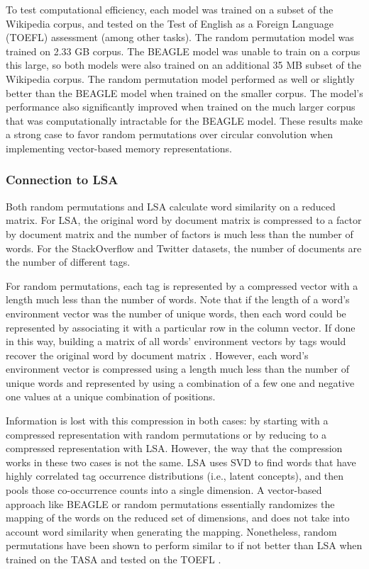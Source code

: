 \documentclass[man,floatsintext,donotrepeattitle]{apa6}
\begin{document}
To test computational efficiency, each model was trained on a subset of the Wikipedia corpus, and tested on the Test of English as a Foreign Language (TOEFL) assessment (among other tasks).
The random permutation model was trained on \num{2.33} GB corpus.
The BEAGLE model was unable to train on a corpus this large, so both models were also trained on an additional \num{35} MB subset of the Wikipedia corpus.
The random permutation model performed as well or slightly better than the BEAGLE model when trained on the smaller corpus.
The model's performance also significantly improved when trained on the much larger corpus that was computationally intractable for the BEAGLE model.
These results make a strong case to favor random permutations over circular convolution when implementing vector-based memory representations.

\subsubsection{Connection to LSA}

Both random permutations and LSA calculate word similarity on a reduced matrix.
For LSA, the original word by document matrix is compressed to a factor by document matrix and the number of factors is much less than the number of words.
For the StackOverflow and Twitter datasets, the number of documents are the number of different tags.

For random permutations, each tag is represented by a compressed vector with a length much less than the number of words.
Note that if the length of a word's environment vector was the number of unique words, then each word could be represented by associating it with a particular row in the column vector.
If done in this way, building a matrix of all words' environment vectors by tags would recover the original word by document matrix \parencite{Kanerva2000}.
However, each word's environment vector is compressed using a length much less than the number of unique words and represented by using a combination of a few one and negative one values at a unique combination of positions. 

Information is lost with this compression in both cases: by starting with a compressed representation with random permutations or by reducing to a compressed representation with LSA.
However, the way that the compression works in these two cases is not the same.
LSA uses SVD to find words that have highly correlated tag occurrence distributions (i.e., latent concepts), and then pools those co-occurrence counts into a single dimension.
A vector-based approach like BEAGLE or random permutations essentially randomizes the mapping of the words on the reduced set of dimensions, and does not take into account word similarity when generating the mapping.
Nonetheless, random permutations have been shown to perform similar to if not better than LSA when trained on the TASA and tested on the TOEFL \parencites{Sahlgren2008,Jones2007}.
\end{document}
